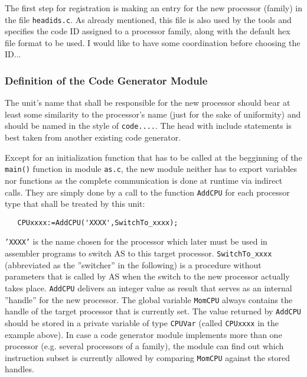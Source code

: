 \documentclass[12pt,twoside]{report}
\newcommand{\tty}[1]{{\tt #1}}
\begin{document}
The first step for registration is making an entry for the new processor
(family) in the file {\tt headids.c}.  As already mentioned, this file is
also used by the tools and specifies the code ID assigned to a processor
family, along with the default hex file format to be used.  I would like
to have some coordination before choosing the ID...

\subsubsection{Definition of the Code Generator Module}

The unit's name that shall be responsible for the new processor
should bear at least some similarity to the processor's name (just
for the sake of uniformity) and should be named in the style of
\tty{code....}.  The head with include statements is best taken from
another existing code generator.

Except for an initialization function that has to be called at the
begginning of the {\tt main()} function in module {\tt as.c}, the new
module neither has to export variables nor functions as the complete
communication is done at runtime via indirect calls.  They are simply done
by a call to the function
\tty{AddCPU} for each processor type that shall be treated by this unit:
\begin{verbatim}
   CPUxxxx:=AddCPU('XXXX',SwitchTo_xxxx);
\end{verbatim}
\tty{'XXXX'} is the name chosen for the processor which later must be used
in assembler programs to switch AS to this target processor. 
\tty{SwitchTo\_xxxx} (abbreviated as the ''switcher'' in the following) is
a procedure without parameters that is called by AS when the switch to the
new processor actually takes place.  \tty{AddCPU} delivers an integer
value as result that serves as an internal ''handle'' for the new
processor.  The global variable \tty{MomCPU} always contains the handle of
the target processor that is currently set.  The value returned by
\tty{AddCPU} should be stored in a private variable of type \tty{CPUVar}
(called \tty{CPUxxxx} in the example above).  In case a code generator
module implements more than one processor (e.g. several processors of a
family), the module can find out which instruction subset is currently
allowed by comparing \tty{MomCPU} against the stored handles.
\end{document}
